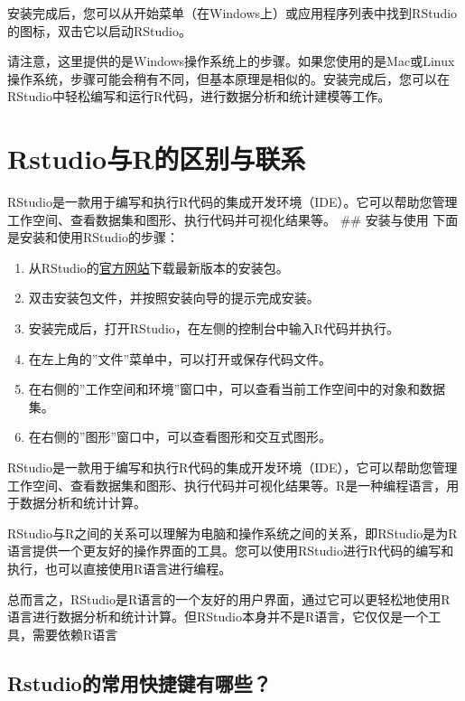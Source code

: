 \documentclass[
  letterpaper,
  DIV=11,
  numbers=noendperiod]{scrreprt}
\begin{document}
安装完成后，您可以从开始菜单（在Windows上）或应用程序列表中找到RStudio的图标，双击它以启动RStudio。

请注意，这里提供的是Windows操作系统上的步骤。如果您使用的是Mac或Linux操作系统，步骤可能会稍有不同，但基本原理是相似的。安装完成后，您可以在RStudio中轻松编写和运行R代码，进行数据分析和统计建模等工作。

\hypertarget{rstudioux4e0erux7684ux533aux522bux4e0eux8054ux7cfb}{%
\chapter{Rstudio与R的区别与联系}\label{rstudioux4e0erux7684ux533aux522bux4e0eux8054ux7cfb}}

RStudio是一款用于编写和执行R代码的集成开发环境（IDE）。它可以帮助您管理工作空间、查看数据集和图形、执行代码并可视化结果等。
\#\# 安装与使用 下面是安装和使用RStudio的步骤：

\begin{enumerate}
\def\labelenumi{\arabic{enumi}.}
\item
  从RStudio的\href{https://posit.co/downloads/}{官方网站}下载最新版本的安装包。
\item
  双击安装包文件，并按照安装向导的提示完成安装。
\item
  安装完成后，打开RStudio，在左侧的控制台中输入R代码并执行。
\item
  在左上角的''文件''菜单中，可以打开或保存代码文件。
\item
  在右侧的''工作空间和环境''窗口中，可以查看当前工作空间中的对象和数据集。
\item
  在右侧的''图形''窗口中，可以查看图形和交互式图形。
\end{enumerate}

RStudio是一款用于编写和执行R代码的集成开发环境（IDE），它可以帮助您管理工作空间、查看数据集和图形、执行代码并可视化结果等。R是一种编程语言，用于数据分析和统计计算。

RStudio与R之间的关系可以理解为电脑和操作系统之间的关系，即RStudio是为R语言提供一个更友好的操作界面的工具。您可以使用RStudio进行R代码的编写和执行，也可以直接使用R语言进行编程。

总而言之，RStudio是R语言的一个友好的用户界面，通过它可以更轻松地使用R语言进行数据分析和统计计算。但RStudio本身并不是R语言，它仅仅是一个工具，需要依赖R语言

\hypertarget{rstudioux7684ux5e38ux7528ux5febux6377ux952eux6709ux54eaux4e9b}{%
\section{Rstudio的常用快捷键有哪些？}\label{rstudioux7684ux5e38ux7528ux5febux6377ux952eux6709ux54eaux4e9b}}
\end{document}

